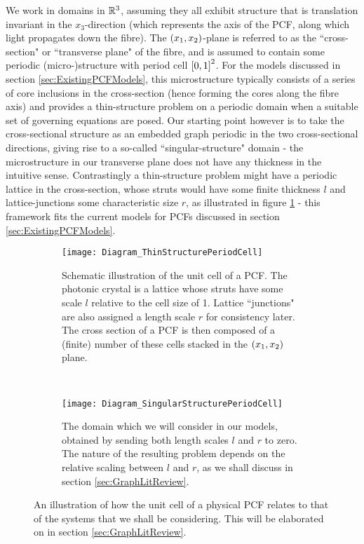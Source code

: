 We work in domains in $\mathbb{R}^3$, assuming they all exhibit structure that is translation invariant in the $x_3$-direction (which represents the axis of the PCF, along which light propagates down the fibre).
The $\left( x_1,x_2 \right)$-plane is referred to as the ``cross-section" or ``transverse plane" of the fibre, and is assumed to contain some periodic (micro-)structure with period cell $\left[ 0,1 \right]^2$.
For the models discussed in section \ref{sec:ExistingPCFModels}, this microstructure typically consists of a series of core inclusions in the cross-section (hence forming the cores along the fibre axis) and provides a thin-structure problem on a periodic domain when a suitable set of governing equations are posed.
Our starting point however is to take the cross-sectional structure as an embedded graph periodic in the two cross-sectional directions, giving rise to a so-called ``singular-structure" domain - the microstructure in our transverse plane does not have any thickness in the intuitive sense.
Contrastingly a thin-structure problem might have a periodic lattice in the cross-section, whose struts would have some finite thickness $l$ and lattice-junctions some characteristic size $r$, as illustrated in figure \ref{fig:Diagram_ThinStructurePeriodCell} - this framework fits the current models for PCFs discussed in section \ref{sec:ExistingPCFModels}.
\begin{figure}[b!]
	\centering
	\begin{subfigure}[t]{0.45\textwidth}
		\centering
		\texttt{[image: Diagram\_ThinStructurePeriodCell]}
		\caption{\label{fig:Diagram_ThinStructurePeriodCell} Schematic illustration of the unit cell of a PCF. The photonic crystal is a lattice whose struts have some scale $l$ relative to the cell size of 1. Lattice ``junctions" are also assigned a length scale $r$ for consistency later. The cross section of a PCF is then composed of a (finite) number of these cells stacked in the $\left( x_1,x_2 \right)$ plane.}
	\end{subfigure}
	~
	\begin{subfigure}[t]{0.45\textwidth}
		\centering
		\texttt{[image: Diagram\_SingularStructurePeriodCell]}
		\caption{\label{fig:Diagram_SingularStructurePeriodCell} The domain which we will consider in our models, obtained by sending both length scales $l$ and $r$ to zero. The nature of the resulting problem depends on the relative scaling between $l$ and $r$, as we shall discuss in section \ref{sec:GraphLitReview}.}
	\end{subfigure}
	\caption{\label{fig:ThinToSingularStructure} An illustration of how the unit cell of a physical PCF relates to that of the systems that we shall be considering. This will be elaborated on in section \ref{sec:GraphLitReview}.}
\end{figure}
